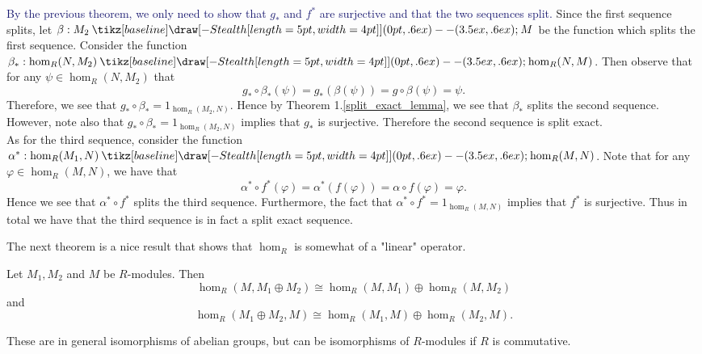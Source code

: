 \documentclass[12pt,letterpaper]{algebra_book}
\renewcommand{\to}{\mathbin{\tikz[baseline] \draw[-{Stealth[length=5pt,width=4pt]}] (0pt,.6ex) -- (3.5ex,.6ex);}}
\renewcommand{\phi}{\varphi}
\theoremstyle{definition}
\begin{document}
\begin{prf}
    \textcolor{MidnightBlue}{By the previous theorem, we only need
    to show that $g_*$ and $f^*$ are surjective and that the two
    sequences split.
    }
    Since the first sequence splits, let $\beta: M_2 \to M$ be the
    function which splits the first sequence. Consider the
    function $\beta_*:
    \hom_R(N, M_2) \to \hom_R(N, M)$. 
    Then observe that for any $\psi \in \hom_R(N, M_2)$ that 
    \[
        g_* \circ \beta_* (\psi) = g_*(\beta(\psi)) = g \circ \beta(\psi) 
        = \psi.
    \]
    Therefore, we see that $g_* \circ \beta_* = 1_{\hom_R(M_{2}, N)}.$ Hence by
    Theorem 1.\ref{split_exact_lemma}, we see that $\beta_*$
    splits the second sequence. However, note also that $g_* \circ
    \beta_* = 1_{\hom_R(M_{2}, N)}$ implies that $g_*$ is surjective. Therefore
    the second sequence is split exact.
    \\

    As for the third sequence, consider the function $\alpha^*:
    \hom_R(M_1, N) \to \hom_R(M, N)$. Note that for any $\phi \in
    \hom_R(M, N)$, we have that 
    \[
        \alpha^* \circ f^*(\phi) = \alpha^*(f(\phi)) = \alpha \circ f(\phi) = \phi.
    \]
    Hence we see that $\alpha^* \circ f^*$ splits the third
    sequence. Furthermore, the fact that $\alpha^* \circ f^* =
    1_{\hom_R(M, N)}$ implies that $f^*$ is surjective. Thus in total
    we have that the third sequence is in fact a split exact sequence.
\end{prf}

The next theorem is a nice result that shows that $\hom_R$ is
somewhat of a "linear" operator.
\begin{thm}
    Let $M_1, M_2$ and $M$ be $R$-modules. Then 
    \[
        \hom_R(M, M_1\oplus M_2) \cong \hom_R(M, M_1)\oplus \hom_R(M, M_2)   
    \]
    and 
    \[
        \hom_R(M_1 \oplus M_2, M) \cong \hom_R(M_1, M) \oplus \hom_R(M_2, M).
    \]  
    \vspace{-0.7cm}
\end{thm}
These are in general isomorphisms of abelian groups, but can
be isomorphisms of $R$-modules if $R$ is commutative.
\end{document}
